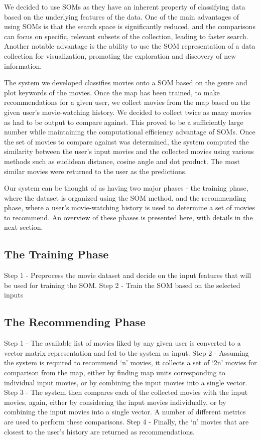 \documentclass[conference]{IEEEtran}
\begin{document}
We decided to use SOMs as they have an inherent property of classifying data based on the underlying features of the data. One of the main advantages of using SOMs is that the search space is significantly reduced, and the comparisons can focus on specific, relevant subsets of the collection, leading to faster search. Another notable advantage is the ability to use the SOM representation of a data collection for visualization, promoting the exploration and discovery of new information.

The system we developed classifies movies onto a SOM based on the genre and plot keywords of the movies. Once the map has been trained, to make recommendations for a given user, we collect movies from the map based on the given user’s movie-watching history. We decided to collect twice as many movies as had to be output to compare against. This proved to be a sufficiently large number while maintaining the computational efficiency advantage of SOMs. Once the set of movies to compare against was determined, the system computed the similarity between the user’s input movies and the collected movies using various methods such as euclidean distance, cosine angle and dot product. The most similar movies were returned to the user as the predictions.

Our system can be thought of as having two major phases - the training phase, where the dataset is organized using the SOM method, and the recommending phase, where a user’s movie-watching history is used to determine a set of movies to recommend. An overview of these phases is presented here, with details in the next section.

\subsection{The Training Phase}
Step 1 - Preprocess the movie dataset and decide on the input features that will be used for training the SOM. 
Step 2 - Train the SOM based on the selected inputs

\subsection{The Recommending Phase}
Step 1 - The available list of movies liked by any given user is converted to a vector matrix representation and fed to the system as input. 
Step 2 - Assuming the system is required to recommend ‘n’ movies, it collects a set of ‘2n’ movies for comparison from the map, either by finding map units corresponding to individual input movies, or by combining the input movies into a single vector. 
Step 3 - The system then compares each of the collected movies with the input movies, again, either by considering the input movies individually, or by combining the input movies into a single vector. A number of different metrics are used to perform these comparisons. 
Step 4 - Finally, the ‘n’ movies that are closest to the user’s history are returned as recommendations. 
\end{document}
